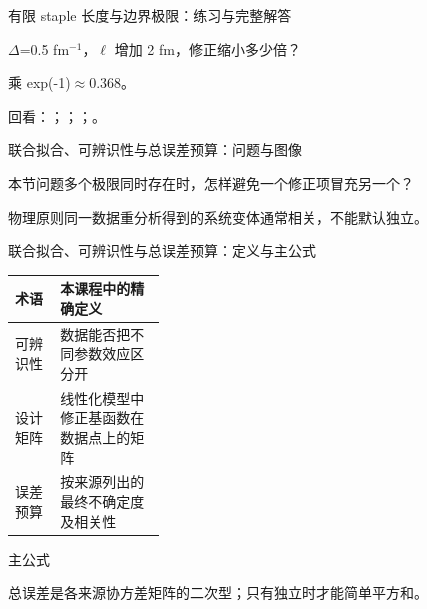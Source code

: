 \begin{frame}[t]{有限 staple 长度与边界极限：练习与完整解答}
\footnotesize
\begin{block}{}\ensuremath{\Delta}=0.5 fm\ensuremath{^{-1}}，\ensuremath{\ell} 增加 2 fm，修正缩小多少倍？\end{block}
\begin{exampleblock}{}乘 exp(-1)\ensuremath{\approx}0.368。\end{exampleblock}
\vfill
\scriptsize 回看：；；；。
\end{frame}

\begin{frame}[t]{联合拟合、可辨识性与总误差预算：问题与图像}
\footnotesize
\begin{block}{本节问题}多个极限同时存在时，怎样避免一个修正项冒充另一个？\end{block}
\begin{block}{物理原则}\quad 同一数据重分析得到的系统变体通常相关，不能默认独立。\end{block}
\end{frame}

\begin{frame}[t]{联合拟合、可辨识性与总误差预算：定义与主公式}
\footnotesize\begin{tabularx}{\linewidth}{p{0.30\linewidth}Y}
\toprule 术语 & 本课程中的精确定义\\\midrule
{} 可辨识性 & 数据能否把不同参数效应区分开\\
 设计矩阵 & 线性化模型中修正基函数在数据点上的矩阵\\
 误差预算 & 按来源列出的最终不确定度及相关性\\
\bottomrule\end{tabularx}\vspace{0.15cm}
\begin{block}{ 主公式}\centering{}\end{block}
总误差是各来源协方差矩阵的二次型；只有独立时才能简单平方和。
\end{frame}

